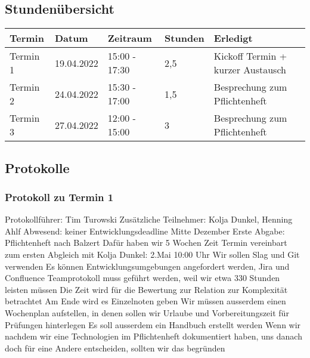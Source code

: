 \subsection{Stundenübersicht}

\begin{tabular}{|l|l|l|l|l|}
\hline
Termin & Datum & Zeitraum & Stunden & Erledigt \\
\hline
    Termin 1 & 19.04.2022 & 15:00 - 17:30 & 2,5 & Kickoff Termin + kurzer Austausch \\
	Termin 2 & 24.04.2022 & 15:30 - 17:00 & 1,5 & Besprechung zum Pflichtenheft \\
	Termin 3 & 27.04.2022 & 12:00 - 15:00 & 3 & Besprechung zum Pflichtenheft \\
\hline
\end{tabular}

\subsection{Protokolle}
\subsubsection{Protokoll zu Termin 1}
Protokollführer: Tim Turowski \newline
Zusätzliche Teilnehmer: Kolja Dunkel, Henning Ahlf \newline
Abwesend: keiner \newline \newline
Entwicklungsdeadline Mitte Dezember \newline
Erste Abgabe: Pflichtenheft nach Balzert \newline
Dafür haben wir 5 Wochen Zeit \newline
Termin vereinbart zum ersten Abgleich mit Kolja Dunkel: 2.Mai 10:00 Uhr \newline
Wir sollen Slag und Git verwenden \newline
Es können Entwicklungsumgebungen angefordert werden, Jira und Confluence \newline
Teamprotokoll muss geführt werden, weil wir etwa 330 Stunden leisten müssen \newline
Die Zeit wird für die Bewertung zur Relation zur Komplexität betrachtet \newline
Am Ende wird es Einzelnoten geben \newline
Wir müssen ausserdem einen Wochenplan aufstellen, in denen sollen wir Urlaube und Vorbereitungszeit für Prüfungen hinterlegen \newline
Es soll ausserdem ein Handbuch erstellt werden \newline
Wenn wir nachdem wir eine Technologien im Pflichtenheft dokumentiert haben, uns danach doch für eine Andere entscheiden, sollten wir das begründen 

